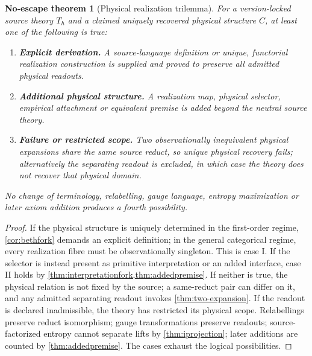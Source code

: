 \documentclass[10pt,a4paper]{article}
\newtheorem{noescape}[theorem]{No-escape theorem}
\theoremstyle{definition}
\theoremstyle{remark}
\begin{document}
\begin{noescape}[Physical realization trilemma]
\label{thm:master}
For a version-locked source theory \(T_h\) and a claimed uniquely recovered
physical structure \(C\), at least one of the following is true:
\begin{enumerate}[label=\textbf{\Roman*.}]
\item \textbf{Explicit derivation.}  A source-language definition or unique,
functorial realization construction is supplied and proved to preserve all
admitted physical readouts.
\item \textbf{Additional physical structure.}  A realization map, physical
selector, empirical attachment or equivalent premise is added beyond the
neutral source theory.
\item \textbf{Failure or restricted scope.}  Two observationally inequivalent
physical expansions share the same source reduct, so unique physical recovery
fails; alternatively the separating readout is excluded, in which case the
theory does not recover that physical domain.
\end{enumerate}
No change of terminology, relabelling, gauge language, entropy maximization or
later axiom addition produces a fourth possibility.
\end{noescape}

\begin{proof}
If the physical structure is uniquely determined in the first-order regime,
\cref{cor:bethfork} demands an explicit definition; in the general categorical
regime, every realization fibre must be observationally singleton.  This is
case I.  If the selector is instead present as primitive interpretation or an
added interface, case II holds by \cref{thm:interpretationfork,thm:addedpremise}.
If neither is true, the physical relation is not fixed by the source; a
same-reduct pair can differ on it, and any admitted separating readout invokes
\cref{thm:two-expansion}.  If the readout is declared inadmissible, the theory
has restricted its physical scope.  Relabellings preserve reduct isomorphism;
gauge transformations preserve readouts; source-factorized entropy cannot
separate lifts by \cref{thm:iprojection}; later additions are counted by
\cref{thm:addedpremise}.  The cases exhaust the logical possibilities.
\end{proof}
\end{document}
